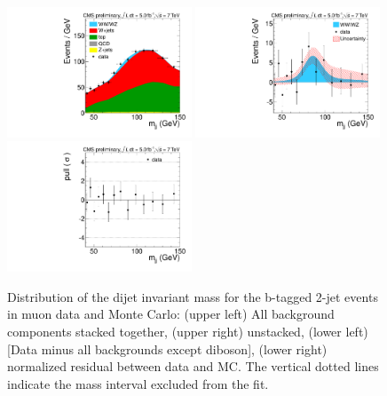 \begin{figure}[h!]
  {\centering
    \includegraphics[width=0.49\textwidth]{figs/mjjfit_2jetsample/Wjj_Diboson_btag_Muon_2jets_Stacked.pdf}
    \includegraphics[width=0.49\textwidth]{figs/mjjfit_2jetsample/Wjj_Diboson_btag_Muon_2jets_Subtracted.pdf}
    \includegraphics[width=0.49\textwidth]{figs/mjjfit_2jetsample/Wjj_Diboson_btag_Muon_2jets_Pull.pdf}
    \caption{Distribution of the dijet invariant mass for the b-tagged 2-jet events in muon data and Monte Carlo: 
      (upper left) All background components stacked together, 
      (upper right) unstacked, (lower left) [Data minus all backgrounds except diboson],  
      (lower right) normalized residual between data and MC. The vertical dotted lines
      indicate the mass interval excluded from the fit.}
    \label{fig:mjj_2jet_mu_btag}}
\end{figure}

